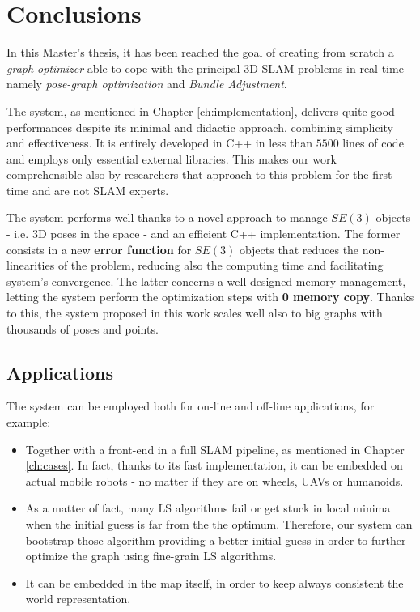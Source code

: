 \chapter{Conclusions}\label{ch:conclusions}
In this Master's thesis, it has been reached the goal of creating from scratch a \textit{graph optimizer} able to cope with the principal 3D SLAM problems in real-time - namely \textit{pose-graph optimization} and \textit{Bundle Adjustment}.

The system, as mentioned in Chapter \ref{ch:implementation}, delivers quite good performances despite its minimal and didactic approach, combining simplicity and effectiveness. It is entirely developed in C++ in less than $5500$ lines of code and employs only essential external libraries. This makes our work comprehensible also by researchers that approach to this problem for the first time and are not SLAM experts.

The system performs well thanks to a novel approach to manage $SE(3)$ objects - i.e. 3D poses in the space - and an efficient C++ implementation. The former consists in a new \textbf{error function} for $SE(3)$ objects that reduces the non-linearities of the problem, reducing also the computing time and facilitating system's convergence. The latter concerns a well designed memory management, letting the system perform the optimization steps with \textbf{0 memory copy}. Thanks to this, the system proposed in this work scales well also to big graphs with thousands of poses and points.

\section{Applications}\label{sec:conclusion_application}
The system can be employed both for on-line and off-line applications, for example:

\begin{itemize}
    \item Together with a front-end in a full SLAM pipeline, as mentioned in Chapter \ref{ch:cases}. In fact, thanks to its fast implementation, it can be embedded on actual mobile robots - no matter if they are on wheels, UAVs or humanoids.
    \item As a matter of fact, many LS algorithms fail or get stuck in local minima when the initial guess is far from the the optimum. Therefore, our system can bootstrap those algorithm providing a better initial guess in order to further optimize the graph using fine-grain LS algorithms.
    \item It can be embedded in the map itself, in order to keep always consistent the world representation.
\end{itemize}

